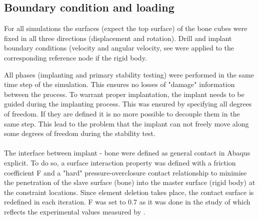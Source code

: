 \documentclass[12pt, a4paper, twoside]{report}
\begin{document}
\subsection{Boundary condition and loading}
%
%
For all simulations the surfaces (expect the top surface) of the bone cubes were fixed in all three directions (displacement and rotation). Drill and implant boundary conditions (velocity and angular velocity, see were applied to the corresponding reference node if the rigid body.
%
\begin{table}[H]
\caption{Boundary conditions of implanting and primary stability test of G1, G2 and G3.}
\label{tab:drillprotocolsGNS}
\end{table}
%
All phases (implanting and primary stability testing) were performed in the same time step of the simulation. This ensures no losses of "damage" information between the process. To warrant proper implantation, the implant needs to be guided during the implanting process. This was ensured by specifying all degrees of freedom. If they are defined it is no more possible to decouple them in the same step. This lead to the problem that the implant can not freely move along some degrees of freedom during the stability test.\\
%
\\
The interface between implant - bone were defined as general contact in Abaqus explicit. To do so, a surface interaction property was defined with a friction coefficient F and a "hard" pressure-overclosure contact relationship to minimise the penetration of the slave surface (bone) into the master surface (rigid body) at the constraint locations. Since element deletion takes place, the contact surface is redefined in each iteration. F was set to 0.7 as it was done in the study of \cite{Ovesy_2019_JMechBehavBiomedMater} which 
reflects the experimental values measured by \cite{Voutat_2019_Biotribology}.
%
%
\end{document}
